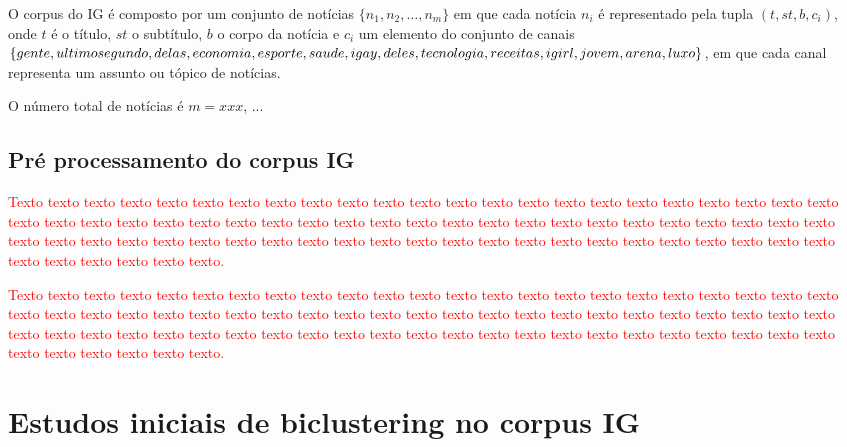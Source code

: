 \documentclass[normaltoc, espacoumemeio, pnumromarab,ruledheader]{abnt}
\begin{document}
O corpus do IG é composto por um conjunto de notícias $\{ n_1, n_2, \dots, n_m \}$ em que cada notícia $n_i$ é representado pela tupla $(t, st, b, c_i)$, onde $t$ é o título, $st$ o subtítulo, $b$ o corpo da notícia e $c_i$ um elemento do conjunto de canais $\{ gente , ultimosegundo , delas , \\economia , esporte , saude , igay , deles , tecnologia , receitas , igirl , jovem , arena , luxo \}$, em que cada canal representa um assunto ou tópico de notícias.


O número total de notícias é $m = xxx$, ...

\subsection{Pré processamento do corpus IG}

\textcolor{red}{Texto texto texto texto texto texto texto texto texto texto texto texto texto texto texto texto texto texto texto texto texto texto texto texto texto texto texto texto texto texto texto texto texto texto texto texto texto texto texto texto texto texto texto texto texto texto texto texto texto texto texto texto texto texto texto texto texto texto texto texto texto texto texto texto texto texto texto texto texto texto texto texto texto texto texto.}

\textcolor{red}{Texto texto texto texto texto texto texto texto texto texto texto texto texto texto texto texto texto texto texto texto texto texto texto texto texto texto texto texto texto texto texto texto texto texto texto texto texto texto texto texto texto texto texto texto texto texto texto texto texto texto texto texto texto texto texto texto texto texto texto texto texto texto texto texto texto texto texto texto texto texto texto texto texto texto texto.}

\section{Estudos iniciais de biclustering no corpus IG}
\end{document}
